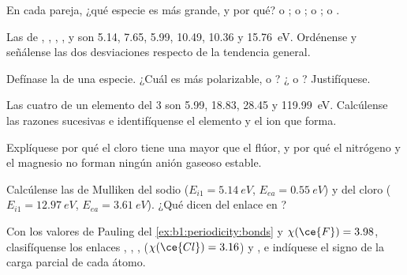 \begin{exercise}[$\star$]\label{exo:b1:periodicity:2}
En cada pareja, ¿qué especie es más grande, y por qué?  o
;  o ;  o ;  o .
\end{exercise}

\begin{exercise}[$\star$]\label{exo:b1:periodicity:3}
Las  de , , , ,
 y  son 5.14, 7.65, 5.99, 10.49, 10.36 y
\qty{15.76}{eV}. Ordénense y señálense las dos desviaciones respecto de
la tendencia general.
\end{exercise}

\begin{exercise}[$\star$]\label{exo:b1:periodicity:4}
Defínase la  de una especie. ¿Cuál es más polarizable,
 o ? ¿ o ? Justifíquese.
\end{exercise}

\begin{exercise}[$\star\star$]\label{exo:b1:periodicity:5}
Las cuatro  de un elemento del  3
son 5.99, 18.83, 28.45 y \qty{119.99}{eV}. Calcúlense las razones
sucesivas e identifíquense el elemento y el ion que forma.
\end{exercise}

\begin{exercise}[$\star\star$]\label{exo:b1:periodicity:6}
Explíquese por qué el cloro tiene una  mayor que el
flúor, y por qué el nitrógeno y el magnesio no forman ningún anión
gaseoso estable.
\end{exercise}

\begin{exercise}[$\star\star$]\label{exo:b1:periodicity:7}
Calcúlense las  de Mulliken del sodio ($E_{i1} =
\qty{5.14}{eV}$, $E_{ea} = \qty{0.55}{eV}$) y del cloro ($E_{i1} =
\qty{12.97}{eV}$, $E_{ea} = \qty{3.61}{eV}$). ¿Qué dicen del enlace en
?
\end{exercise}

\begin{exercise}[$\star\star$]\label{exo:b1:periodicity:8}
Con los valores de Pauling del \cref{ex:b1:periodicity:bonds} y $\chi(\ce{F})
= 3.98$, clasifíquense los enlaces , , ,
 ($\chi(\ce{Cl}) = 3.16$) y , e indíquese el signo de la
carga parcial de cada átomo.
\end{exercise}

